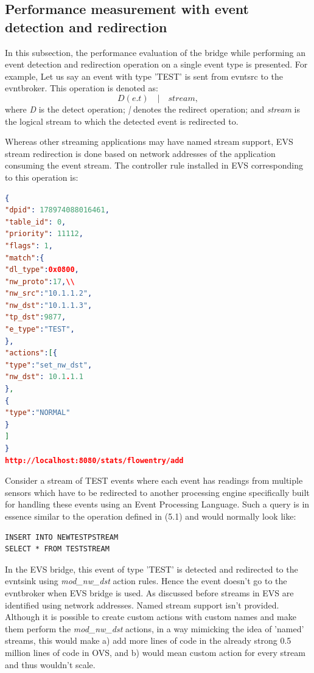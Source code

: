 \subsection{Performance measurement with event detection and redirection}
In this subsection, the performance evaluation of the bridge while performing an event detection and redirection operation on a single event type is presented.  For example, Let us say an event with type 'TEST' is sent from evntsrc to the evntbroker. 
This operation is denoted as: \begin{equation} D(e.t) \quad | \quad stream,  \end{equation}
where \textit{D} is the detect operation; \newline
\textit{|} denotes the redirect operation; \newline
and \textit{stream} is the logical stream to which the detected event is redirected to. \newline \newline

Whereas other streaming applications may have named stream support, EVS stream redirection is done based on network addresses of the application consuming the event stream. The controller rule installed in EVS corresponding to this operation is:

\begin{lstlisting}[language=json,firstnumber=1]
{
"dpid": 178974088016461,
"table_id": 0,
"priority": 11112,
"flags": 1,
"match":{
"dl_type":0x0800,
"nw_proto":17,\\
"nw_src":"10.1.1.2",
"nw_dst":"10.1.1.3",
"tp_dst":9877,
"e_type":"TEST",
},
"actions":[{
"type":"set_nw_dst",
"nw_dst": 10.1.1.1
},
{
"type":"NORMAL"
}
]
}
http://localhost:8080/stats/flowentry/add \end{lstlisting}

Consider a stream of TEST events where each event has readings from multiple sensors which have to be redirected to another processing engine specifically built for handling these events using an Event Processing Language. Such a query is in essence similar to the operation defined in (5.1) and would normally look like:

\begin{verbatim}
INSERT INTO NEWTESTPSTREAM
SELECT * FROM TESTSTREAM
\end{verbatim}

In the EVS bridge, this event of type 'TEST' is detected and redirected to the evntsink using \textit{mod_nw_dst} action rules. Hence the event doesn't go to the evntbroker when EVS bridge is used. As discussed before streams in EVS are identified using network addresses. Named stream support isn't provided. Although it is possible to create custom actions with custom names and make them perform the \textit{mod_nw_dst} actions, in a way mimicking the idea of 'named' streams, this would make a) add more lines of code in the already strong 0.5 million lines of code in OVS, and b) would mean custom action for every stream and thus wouldn't scale.

